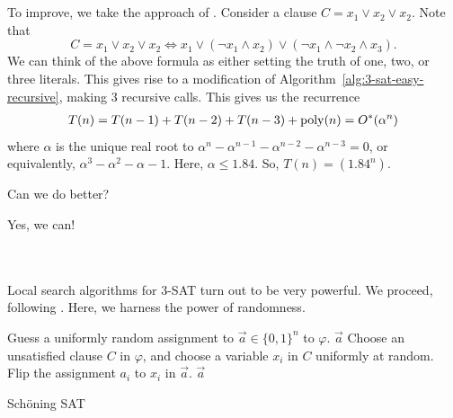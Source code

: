         \vphantom
        \\
        \\
        To improve, we take the approach of \cite{monien1985satisfiability}. Consider a clause \(C=x_1\vee x_2\vee x_2\). Note that
        \begin{equation*}
            C=x_1\vee x_2\vee x_2\iff x_1\vee(\neg x_1\wedge x_2)\vee(\neg x_1\wedge \neg x_2\wedge x_3).
        \end{equation*}
        We can think of the above formula as either setting the truth of one, two, or three literals. This gives rise to a modification of Algorithm~\ref{alg:3-sat-easy-recursive}, making \(3\) recursive calls. This gives us the recurrence
        \begin{align*}
            T(n)=T(n-1)+T(n-2)+T(n-3)+\operatorname{poly}(n)=O^*(\alpha^n)
        \end{align*}
        where \(\alpha\) is the unique real root to \(\alpha^n-\alpha^{n-1}-\alpha^{n-2}-\alpha^{n-3}=0\), or equivalently, \(\alpha^3-\alpha^2-\alpha-1\). Here, \(\alpha\leq 1.84\). So, \(T(n)=(1.84^n)\).
        \begin{question*}
            Can we do better?
        \end{question*}
        \begin{answer*}
            Yes, we can!
        \end{answer*}
        \vphantom
        \\
        \\
        Local search algorithms for \(3\)-\textsc{SAT} turn out to be very powerful. We proceed, following \cite{schoning1999probabilisticksat,spielman2007satlecture}. Here, we harness the power of randomness.
        \begin{algorithm}[H] 
            \begin{algorithmic}[1]
                    \State Guess a uniformly random assignment to \(\vec{a}\in\{0,1\}^n\) to \(\varphi\).
                         \Return \(\vec{a}\)
                        \Else
                            \State Choose an unsatisfied clause \(C\) in \(\varphi\), and choose a variable \(x_i\) in \(C\) uniformly at random.
                            \State Flip the assignment \(a_i\) to \(x_i\) in \(\vec{a}\).
                        \EndIf
                    \EndFor
                    \State \Return \(\vec{a}\)
                \EndProcedure 
            \end{algorithmic}
            \caption{Sch\"oning SAT}
            \label{alg:schoningsat}
        \end{algorithm}
